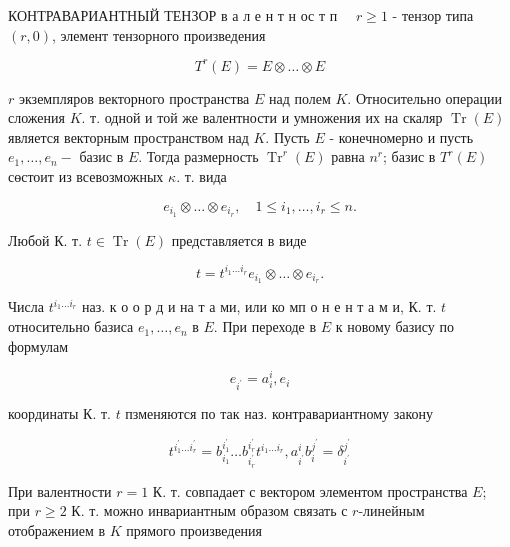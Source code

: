 \documentclass[10pt]{article}
\begin{document}
КОНТРАВАРИАНТНЫЙ ТЕНЗОР в а л е н т н ос т п $\quad r \geqslant 1$ - тензор типа $(r, 0)$, элемент тензорного произведения



\[

T^{r}(E)=E \otimes \ldots \otimes E

\]



$r$ экземпляров векторного пространства $E$ над полем $K$. Относительно операции сложения $K$. т. одной и той же валентности и умножения их на скаляр $\operatorname{Tr}(E)$ является векторным пространством над $K$. Пусть $E$ - конечномерно и пусть $e_{1}, \ldots, e_{n}-$ базис в $E$. Тогда размерность $\operatorname{Tr}^{r}(E)$ равна $n^{r}$; базис в $T^{r}(E)$ сөстоит из всевозможных $\kappa$. т. вида



\[

e_{i_{1}} \otimes \ldots \otimes e_{i_{r}}, \quad 1 \leqslant i_{1}, \ldots, i_{r} \leqslant n .

\]



Любой К. т. $t \in \operatorname{Tr}(E)$ представляется в виде



\[

t=t^{i_{1} \ldots i_{r}} e_{i_{1}} \otimes \ldots \otimes e_{i_{r}} .

\]



Числа $t^{i_{1} \ldots i_{r}}$ наз. к о о р д и на т а ми, или ко мп о н е н т а м и, К. т. $t$ относительно базиса $e_{1}, \ldots, e_{n}$ в $E$. При переходе в $E$ к новому базису по формулам



\[

e_{i^{\prime}}=a_{i}^{i}, e_{i}

\]



координаты К. т. $t$ пзменяются по так наз. контравариантному закону



\[

t^{i_{1}^{\prime} \ldots i_{r}^{\prime}}=b_{i_{1}}^{i_{1}^{\prime}} \ldots b_{i_{r}^{\prime}}^{i_{r}^{\prime}} t^{i_{1} \ldots i_{r}}, a_{i^{\prime}}^{i} b_{i}^{j^{\prime}}=\delta_{i^{\prime}}^{j^{\prime}}

\]



При валентности $r=1$ К. т. совпадает с вектором элементом пространства $E$; при $r \geqslant 2$ К. т. можно инвариантным образом связать с $r$-линейным отображением в $K$ прямого произведения
\end{document}
